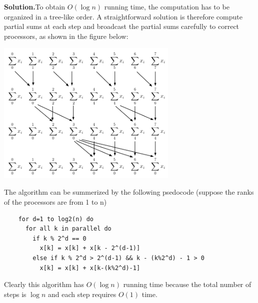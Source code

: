 \documentclass{article}
\theoremstyle{definition}
\newenvironment{solution}{\noindent\textbf{Solution.}}{\bigbreak}
\begin{document}
\begin{solution}To obtain $O(\log n)$ running time, the computation has to be organized in a tree-like order.
  A straightforward solution is therefore compute partial sums at each step and broadcast the partial sums carefully
  to correct processors, as shown in the figure below:
  \begin{center}
    \includegraphics[width=0.65\textwidth]{naive.png}
  \end{center}
  The algorithm can be summerized by the following psedocode (suppose the ranks of the processors are from 1 to n)
  \begin{lstlisting}
    for d=1 to log2(n) do
      for all k in parallel do
        if k % 2^d == 0
          x[k] = x[k] + x[k - 2^(d-1)]
        else if k % 2^d > 2^(d-1) && k - (k%2^d) - 1 > 0
          x[k] = x[k] + x[k-(k%2^d)-1]
  \end{lstlisting}

  Clearly this algorithm has $O(\log n)$ running time because the total number of steps is $\log n$ and each step
  requires $O(1)$ time.


\end{solution}
\end{document}

